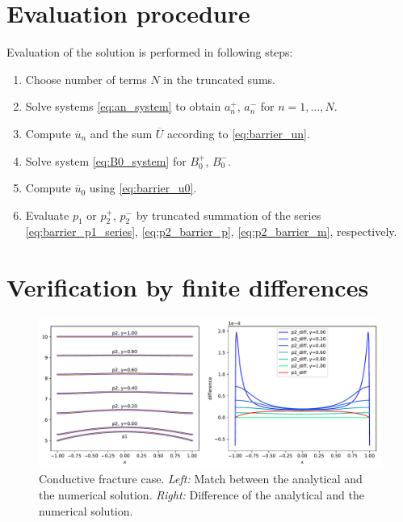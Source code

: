 \documentclass[a4paper,10pt]{article}
\def\ol#1{\overline{#1}}
\begin{document}
\section{Evaluation procedure}

Evaluation of the solution is performed in following steps:
\begin{enumerate}
    \item Choose number of terms $N$ in the truncated sums.
    \item Solve systems \eqref{eq:an_system} to obtain $a_n^+$, $a_n^-$ for $n=1,\dots, N$.
    \item Compute $\ol{u}_n$ and the sum $\ol{U}$ according to \eqref{eq:barrier_un}.
    \item Solve system \eqref{eq:B0_system} for $B_0^+$, $B_0^-$.
    \item Compute $\ol{u}_0$ using \eqref{eq:barrier_u0}.
    \item Evaluate $p_1$ or $p_2^+$, $p_2^-$ by truncated summation of the series \eqref{eq:barrier_p1_series},
          \eqref{eq:p2_barrier_p}, \eqref{eq:p2_barrier_m}, respectively.
\end{enumerate}





\section{Verification by finite differences}
\label{sec:verify}

\begin{figure}
  \label{fig:cont_solution}
  \centering
  \includegraphics[width=\textwidth]{./continuous_solution.pdf}
  \caption{Conductive fracture case. 
  {\it Left:} Match between the analytical and the numerical solution. 
  {\it Right:} Difference of the analytical and the numerical solution.}
\end{figure}
\end{document}
